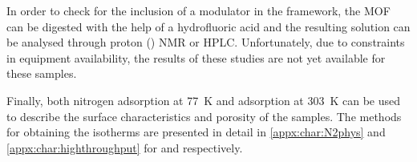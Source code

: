 In order to check for the inclusion of a modulator in the framework,
the \gls{MOF} can be digested with the help of a hydrofluoric acid and the
resulting solution can be analysed through proton () \gls{NMR} 
or \gls{HPLC}. Unfortunately, due
to constraints in equipment availability,
the results of these studies are not yet available for these samples.

Finally, both nitrogen adsorption at \SI{77}{\kelvin} and 
adsorption at \SI{303}{\kelvin} can be used to describe the surface
characteristics and porosity of the samples. The methods for obtaining
the isotherms are presented in detail in \autoref{appx:char:N2phys}
and \autoref{appx:char:highthroughput} for  and 
respectively.